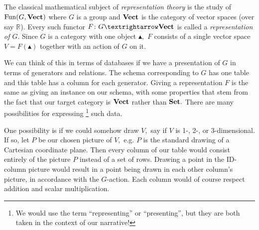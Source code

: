 \documentclass[../main/CT4S-EN-RU]{subfiles}
\begin{document}
\begin{exerciseRUS}   
\end{exerciseRUS}


\subsection{}


\subsubsection{}\label{ex:reps of groups}

\begin{blockENG}
The classical mathematical subject of {\em representation theory} is the study of $\operatorname{Fun}(G,{\mathbf{Vect}})$ where $G$ is a group and ${\mathbf{Vect}}$ is the category of vector spaces (over say ${ℝ}$). Every such functor $F\colon G{→}\Vect$ is called a {\em representation of $G$}. Since $G$ is a category with one object ${▴},$ $F$ consists of a single vector space $V=F({▴})$ together with an action of $G$ on it. 
\end{blockENG}

\begin{blockRUS}
\end{blockRUS}

\begin{blockENG}
We can think of this in terms of databases if we have a presentation of $G$ in terms of generators and relations. The schema corresponding to $G$ has one table and this table has a column for each generator. Giving a representation $F$ is the same as giving an instance on our schema, with some properties that stem from the fact that our target category is ${\mathbf{Vect}}$ rather than ${\mathbf{Set}}.$ There are many possibilities for expressing
\footnote{We would use the term “representing” or “presenting”, but they are both taken in the context of our narrative!}
such data.
\end{blockENG}

\begin{blockRUS}
\end{blockRUS}

\begin{blockENG}
One possibility is if we could somehow draw $V,$ say if $V$ is 1-, 2-, or 3-dimensional. If so, let $P$ be our chosen picture of $V,$ e.g. $P$ is the standard drawing of a Cartesian coordinate plane. Then every column of our table would consist entirely of the picture $P$ instead of a set of rows. Drawing a point in the ID-column picture would result in a point being drawn in each other column's picture, in accordance with the $G$-action. Each column would of course respect addition and scalar multiplication.
\end{blockENG}
\end{document}
